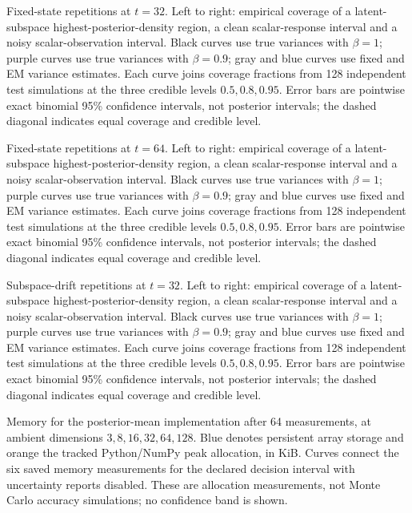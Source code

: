 \caption{Fixed-state repetitions at $t=32$. Left to right: empirical coverage of a latent-subspace highest-posterior-density region, a clean scalar-response interval and a noisy scalar-observation interval. Black curves use true variances with $\beta=1$; purple curves use true variances with $\beta=0.9$; gray and blue curves use fixed and EM variance estimates. Each curve joins coverage fractions from 128 independent test simulations at the three credible levels $0.5,0.8,0.95$. Error bars are pointwise exact binomial 95\% confidence intervals, not posterior intervals; the dashed diagonal indicates equal coverage and credible level.}

\caption{Fixed-state repetitions at $t=64$. Left to right: empirical coverage of a latent-subspace highest-posterior-density region, a clean scalar-response interval and a noisy scalar-observation interval. Black curves use true variances with $\beta=1$; purple curves use true variances with $\beta=0.9$; gray and blue curves use fixed and EM variance estimates. Each curve joins coverage fractions from 128 independent test simulations at the three credible levels $0.5,0.8,0.95$. Error bars are pointwise exact binomial 95\% confidence intervals, not posterior intervals; the dashed diagonal indicates equal coverage and credible level.}

\caption{Subspace-drift repetitions at $t=32$. Left to right: empirical coverage of a latent-subspace highest-posterior-density region, a clean scalar-response interval and a noisy scalar-observation interval. Black curves use true variances with $\beta=1$; purple curves use true variances with $\beta=0.9$; gray and blue curves use fixed and EM variance estimates. Each curve joins coverage fractions from 128 independent test simulations at the three credible levels $0.5,0.8,0.95$. Error bars are pointwise exact binomial 95\% confidence intervals, not posterior intervals; the dashed diagonal indicates equal coverage and credible level.}

\caption{Memory for the posterior-mean implementation after 64 measurements, at ambient dimensions $3,8,16,32,64,128$. Blue denotes persistent array storage and orange the tracked Python/NumPy peak allocation, in KiB. Curves connect the six saved memory measurements for the declared decision interval with uncertainty reports disabled. These are allocation measurements, not Monte Carlo accuracy simulations; no confidence band is shown.}

